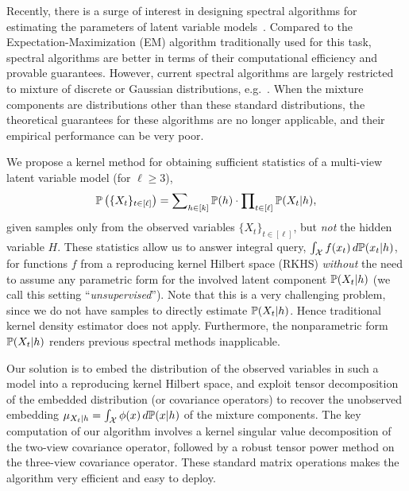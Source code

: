 \documentclass{article}
\begin{document}
\setlength{\abovedisplayskip}{4pt}
\setlength{\abovedisplayshortskip}{1pt}
\setlength{\belowdisplayskip}{4pt}
\setlength{\belowdisplayshortskip}{1pt}
\setlength{\jot}{3pt}

\setlength{\textfloatsep}{3ex}

Recently, there is a surge of interest in designing spectral algorithms for estimating the parameters of latent variable models~\citep{HsuKakZha09,ParSonXin11,SonParXin11,FosRodUng12,AnandkumarEtal:tensor12, AnandkumarEtal:twosvd12, Franz13}. Compared to the Expectation-Maximization (EM) algorithm \citep{DemLaiRub77} traditionally used for this task, spectral algorithms are better in terms of their computational efficiency and provable guarantees.
However, current spectral algorithms are largely restricted to mixture
of discrete or Gaussian distributions, e.g.~\citep{AnandkumarEtal:tensor12,HsuKak13}. When the mixture components are distributions other than these standard distributions, the theoretical guarantees for these algorithms are no longer applicable, and their empirical performance can be very poor.

We propose a kernel method for obtaining sufficient statistics of a multi-view latent variable model (for $\ell\geq 3$),
\begin{align}
  \mathbb{P}\left(\{X_t\}_{t \in [\ell]}\right)=\sum\nolimits_{h \in [k]} \mathbb{P}(h) \cdot \prod\nolimits_{t \in [\ell]} \mathbb{P}(X_t|h),
  \label{eq:multiview_model}
\end{align}
given samples only from the observed variables $\{X_t\}_{t \in [\ell]}$, but \emph{not} the hidden variable $H$. These statistics allow us to answer integral query, $\int_{\mathcal{X}} f(x_t)\, d \mathbb{P}(x_t|h)$, for functions $f$ from a reproducing kernel Hilbert space (RKHS) \emph{without} the need to assume any parametric form for the involved latent component $\mathbb{P}(X_t|h)$ (we call this setting ``\emph{unsupervised}''). Note that this is a very challenging problem, since we do not have samples to directly estimate $\mathbb{P}(X_t|h)$. Hence traditional kernel density estimator does not apply. Furthermore, the nonparametric form $\mathbb{P}(X_t|h)$ renders previous spectral methods inapplicable.

Our solution is to embed the distribution of the observed variables in such a model into a reproducing kernel Hilbert space, and exploit tensor decomposition of the embedded distribution (or covariance operators)
to recover the unobserved embedding $\mu_{X_t|h}=\int_{\mathcal{X}} \phi(x)\, d\mathbb{P}(x|h)$ of the mixture components. The key computation of our algorithm involves a kernel singular value decomposition of the two-view covariance operator, followed by a robust tensor power method on the three-view covariance operator. These standard matrix operations makes the algorithm very efficient and easy to deploy.
\end{document}
